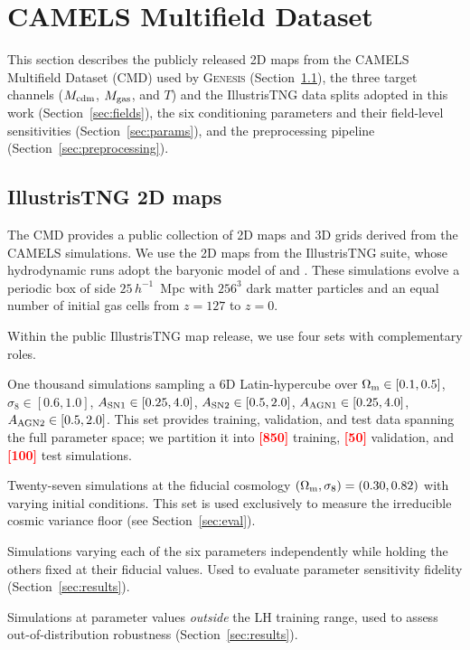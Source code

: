 \documentclass[usenatbib]{mnras}
\newcommand{\FILL}[1]{\textcolor{red}{\textbf{[#1]}}}
\newcommand{\Mcdm}{M_{\rm cdm}}
\newcommand{\Mgas}{M_{\rm gas}}
\newcommand{\Tgas}{T}
\newcommand{\Om}{\Omega_{\rm m}}
\newcommand{\sig}{\sigma_8}
\begin{document}
\section{CAMELS Multifield Dataset}
\label{sec:data}

This section describes the publicly released 2D maps from the CAMELS
Multifield Dataset (CMD) used by \textsc{Genesis}
(Section~\ref{sec:camels}), the three target channels
($\Mcdm$, $\Mgas$, and $\Tgas$) and the IllustrisTNG data splits
adopted in this work (Section~\ref{sec:fields}), the six conditioning
parameters and their field-level sensitivities
(Section~\ref{sec:params}), and the preprocessing pipeline
(Section~\ref{sec:preprocessing}).

\subsection{IllustrisTNG 2D maps}
\label{sec:camels}

The CMD \citep{Villaescusa2022} provides a public collection of 2D maps
and 3D grids derived from the CAMELS simulations.
We use the 2D maps from the IllustrisTNG suite, whose hydrodynamic runs
adopt the baryonic model of \citet{Weinberger2017} and
\citet{Pillepich2018IllustrisTNG}.
These simulations evolve a periodic box of side
$25\,h^{-1}$~Mpc with $256^3$ dark matter particles and an equal number
of initial gas cells from $z=127$ to $z=0$.

Within the public IllustrisTNG map release, we use four sets with
complementary roles.

\begin{description}[font=\normalfont\bfseries,leftmargin=2.2em,labelsep=0.6em]
  \item[LH set.] One thousand simulations sampling a 6D Latin-hypercube over
$\Om \in [0.1, 0.5]$,
$\sig \in [0.6, 1.0]$,
$A_{\rm SN1} \in [0.25, 4.0]$,
$A_{\rm SN2} \in [0.5, 2.0]$,
$A_{\rm AGN1} \in [0.25, 4.0]$,
$A_{\rm AGN2} \in [0.5, 2.0]$.
This set provides training, validation, and test data spanning the
full parameter space; we partition it into \FILL{850} training,
\FILL{50} validation, and \FILL{100} test simulations.

  \item[CV set.] Twenty-seven simulations at the fiducial cosmology
$(\Om, \sig) = (0.30, 0.82)$
with varying initial conditions.
This set is used exclusively to measure the irreducible cosmic variance
floor (see Section~\ref{sec:eval}).

  \item[1P set.] Simulations varying each of the six parameters
independently while
holding the others fixed at their fiducial values.
Used to evaluate parameter sensitivity fidelity
(Section~\ref{sec:results}).

  \item[EX set.] Simulations at parameter values \emph{outside} the LH
training range,
used to assess out-of-distribution robustness
(Section~\ref{sec:results}).
\end{description}
\end{document}
